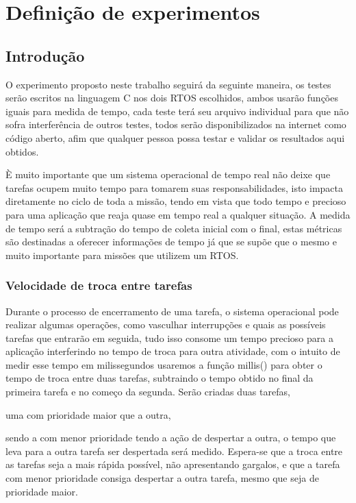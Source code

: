
\chapter{Definição de experimentos}\label{cap:definicoes}
\section{Introdução}
O experimento proposto neste trabalho seguirá da seguinte maneira, os testes serão
escritos na linguagem C nos dois RTOS escolhidos, ambos usarão funções iguais para
medida de tempo, cada teste terá seu arquivo individual para que não sofra
interferência de outros testes, todos serão disponibilizados na internet como código
aberto, afim que qualquer pessoa possa testar e validar os resultados aqui obtidos.

È muito importante que um sistema operacional de tempo real não deixe que tarefas
ocupem muito tempo para tomarem suas responsabilidades, isto impacta diretamente no
ciclo de toda a missão, tendo em vista que todo tempo e precioso para uma aplicação
que reaja quase em tempo real a qualquer situação. A medida de tempo será a subtração
do tempo de coleta inicial com o final, estas métricas são destinadas a oferecer
informações de tempo já que se supõe que o mesmo e muito importante para missões que
utilizem um RTOS.

\subsection{Velocidade de troca entre tarefas}
Durante o processo de encerramento de uma tarefa, o sistema operacional pode realizar
algumas operações, como vasculhar interrupções e quais as possíveis tarefas que
entrarão em seguida, tudo isso consome um tempo precioso para a aplicação
interferindo no tempo de troca para outra atividade, com o intuito de medir esse
tempo em milissegundos usaremos a função millis() para obter o tempo de troca entre
duas tarefas, subtraindo o tempo obtido no final da primeira tarefa e no começo da
segunda. Serão criadas duas tarefas,


uma com prioridade maior que a outra,


sendo a
com menor prioridade tendo a ação de despertar a outra, o tempo que leva para a outra
tarefa ser despertada será medido. Espera-se que a troca entre as tarefas seja a mais
rápida possível, não apresentando gargalos, e que a tarefa com menor prioridade consiga
despertar a outra tarefa, mesmo que seja de prioridade maior.

